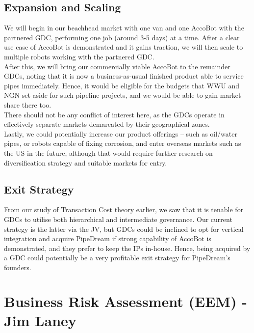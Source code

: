 \documentclass[11pt]{article}		%
\begin{document}
	\subsection{Expansion and Scaling}
	We will begin in our beachhead market with one van and one AccoBot with the partnered GDC, performing one job (around 3-5 days) at a time. After a clear use case of AccoBot is demonstrated and it gains traction, we will then scale to multiple robots working with the partnered GDC.
    \\ \hspace*{3ex}After this, we will bring our commercially viable AccoBot to the remainder GDCs, noting that it is now a business-as-usual finished product able to service pipes immediately. Hence, it would be eligible for the budgets that WWU and NGN set aside for such pipeline projects, and we would be able to gain market share there too. 
    \\ \hspace*{3ex}There should not be any conflict of interest here, as the GDCs operate in effectively separate markets demarcated by their geographical zones. 
    \\ \hspace*{3ex}Lastly, we could potentially increase our product offerings – such as oil/water pipes, or robots capable of fixing corrosion, and enter overseas markets such as the US in the future, although that would require further research on diversification strategy and suitable markets for entry. 

	\subsection{Exit Strategy}
	From our study of Transaction Cost theory earlier, we saw that it is tenable for GDCs to utilise both hierarchical and intermediate governance. Our current strategy is the latter via the JV, but GDCs could be inclined to opt for vertical integration and acquire PipeDream if strong capability of AccoBot is demonstrated, and they prefer to keep the IPs in-house. Hence, being acquired by a GDC could potentially be a very profitable exit strategy for PipeDream’s founders. 
	
	\section[Business Risk Assessment - EEM]{Business Risk Assessment (EEM) - Jim Laney}
     	
\end{document}
